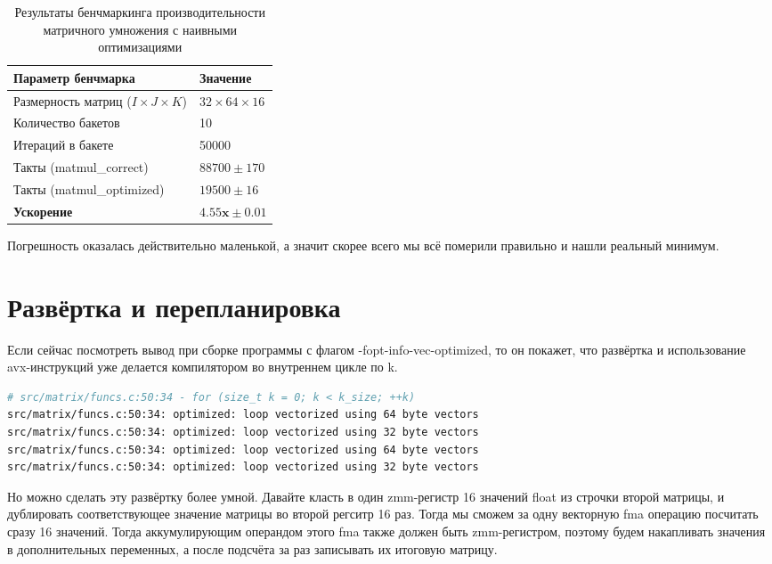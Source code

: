 \documentclass[12pt]{extarticle}
\begin{document}
\begin{table}[h!]
\centering
\begin{tabular}{|l|l|}
\hline
\textbf{Параметр бенчмарка} & \textbf{Значение} \\ \hline
Размерность матриц ($I \times J \times K$) & $32 \times 64 \times 16$ \\ \hline
Количество бакетов & 10 \\ \hline
Итераций в бакете & 50000 \\ \hline
Такты (matmul\_correct) & $88700 \pm 170$ \\ \hline
Такты (matmul\_optimized) & $19500 \pm 16$ \\ \hline
\textbf{Ускорение} & $\mathbf{4.55x \pm 0.01}$ \\ \hline
\end{tabular}
\caption{Результаты бенчмаркинга производительности матричного умножения с наивными оптимизациями}
\label{table:matmul_bench}
\end{table}

Погрешность оказалась действительно маленькой, а значит скорее всего мы всё померили правильно и нашли реальный минимум. 

\section{Развёртка и перепланировка}

Если сейчас посмотреть вывод при сборке программы с флагом -fopt-info-vec-optimized, то он покажет, что развёртка и использование avx-инструкций уже делается компилятором во внутреннем цикле по k.

\begin{lstlisting}[language=bash]
# src/matrix/funcs.c:50:34 - for (size_t k = 0; k < k_size; ++k) 
src/matrix/funcs.c:50:34: optimized: loop vectorized using 64 byte vectors
src/matrix/funcs.c:50:34: optimized: loop vectorized using 32 byte vectors
src/matrix/funcs.c:50:34: optimized: loop vectorized using 64 byte vectors
src/matrix/funcs.c:50:34: optimized: loop vectorized using 32 byte vectors
\end{lstlisting}

Но можно сделать эту развёртку более умной. Давайте класть в один zmm-регистр 16 значений float из строчки второй матрицы, и дублировать соответствующее значение матрицы во второй регситр 16 раз. Тогда мы сможем за одну векторную fma операцию посчитать сразу 16 значений. Тогда аккумулирующим операндом этого fma также должен быть zmm-регистром, поэтому будем накапливать значения в дополнительных переменных, а после подсчёта за раз записывать их итоговую матрицу.
\end{document}
